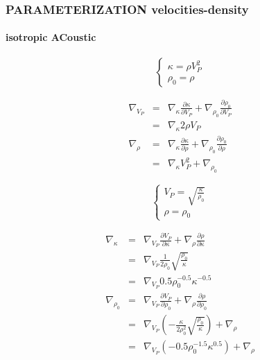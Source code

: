 \documentclass[9pt]{beamer}
\newcommand{\partderi}[2]{\frac{\partial#1}{\partial#2}}
\begin{document}
\begin{frame}\frametitle{PARAMETERIZATION velocities-density}
\framesubtitle{isotropic ACoustic}
  
  \begin{minipage}{0.5\linewidth}
    \[\left\{ \begin{array}{l}
      \kappa = \rho V_P^2 \\
      \rho_0 = \rho 
    \end{array} \right.\]
    
    \begin{eqnarray}
      \nabla_{V_P} &=& \nabla_{\kappa} \partderi{\kappa}{V_P} + \nabla_{\rho_0} \partderi{\rho_0}{V_P} \nonumber\\
                   &=& \nabla_{\kappa} 2\rho V_P \nonumber\\
      \nabla_{\rho} &=& \nabla_{\kappa} \partderi{\kappa}{\rho} + \nabla_{\rho_0} \partderi{\rho_0}{\rho} \nonumber\\
		    &=& \nabla_{\kappa} V_P^2 + \nabla_{\rho_0} \nonumber
    \end{eqnarray}

  \end{minipage} \vline
  \begin{minipage}{0.45\linewidth}
    \[\left\{ \begin{array}{l}
      V_P  = \sqrt{\frac{\kappa}{\rho_0}} \\
      \rho = \rho_0
    \end{array} \right.\]
    
    \begin{eqnarray}
      \nabla_{\kappa} &=& \nabla_{V_P} \partderi{V_P}{\kappa} + \nabla_{\rho} \partderi{\rho}{\kappa} \nonumber\\
                      &=& \nabla_{V_P} \frac{1}{2\rho_0}\sqrt{\frac{\rho_0}{\kappa}} \nonumber\\
                      &=& \nabla_{V_P} 0.5\rho_0^{-0.5}\kappa^{-0.5} \nonumber\\
      \nabla_{\rho_0} &=& \nabla_{V_P} \partderi{V_P}{\rho_0} + \nabla_{\rho} \partderi{\rho}{\rho_0} \nonumber\\
                      &=& \nabla_{V_P} \left(-\frac{\kappa}{2\rho_0^2}\sqrt{\frac{\rho_0}{\kappa}}\right) + \nabla_{\rho} \nonumber\\
                      &=& \nabla_{V_P} \left(-0.5\rho_0^{-1.5}\kappa^{0.5}\right) + \nabla_{\rho} \nonumber
    \end{eqnarray}
  \end{minipage}

\end{frame}
\end{document}
